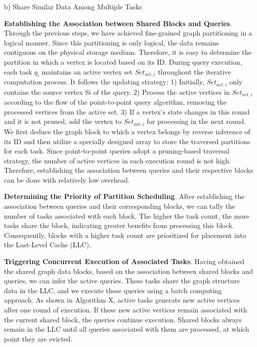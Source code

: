 \documentclass[lettersize,journal]{IEEEtran} %
\begin{document}
b) Share Similar Data Among Multiple Tasks

{\bf{Establishing the Association between Shared Blocks and Queries}}. Through the previous steps, we have achieved fine-grained graph partitioning in a logical manner. Since this partitioning is only logical, the data remains contiguous on the physical storage medium. Therefore, it is easy to determine the partition in which a vertex is located based on its ID. During query execution, each task $q_i$ maintains an active vertex set $Set_{act,i}$ throughout the iterative computation process. It follows the updating strategy: 1) Initially, $Set_{act,i}$ only contains the source vertex Si of the query. 2) Process the active vertices in $Set_{act,i}$ according to the flow of the point-to-point query algorithm, removing the processed vertices from the active set. 3) If a vertex's state changes in this round and it is not pruned, add the vertex to $Set_{act,i}$ for processing in the next round. We first deduce the graph block to which a vertex belongs by reverse inference of its ID and then utilize a specially designed array to store the traversed partitions for each task. Since point-to-point queries adopt a pruning-based traversal strategy, the number of active vertices in each execution round is not high. Therefore, establishing the association between queries and their respective blocks can be done with relatively low overhead.

{\bf{Determining the Priority of Partition Scheduling}}. After establishing the association between queries and their corresponding blocks, we can tally the number of tasks associated with each block. The higher the task count, the more tasks share the block, indicating greater benefits from processing this block. Consequently, blocks with a higher task count are prioritized for placement into the Last-Level Cache (LLC).

{\bf{Triggering Concurrent Execution of Associated Tasks}}. Having obtained the shared graph data blocks, based on the association between shared blocks and queries, we can infer the active queries. These tasks share the graph structure data in the LLC, and we execute these queries using a batch computing approach. As shown in Algorithm X, active tasks generate new active vertices after one round of execution. If these new active vertices remain associated with the current shared block, the queries continue execution. Shared blocks always remain in the LLC until all queries associated with them are processed, at which point they are evicted.
\end{document}
